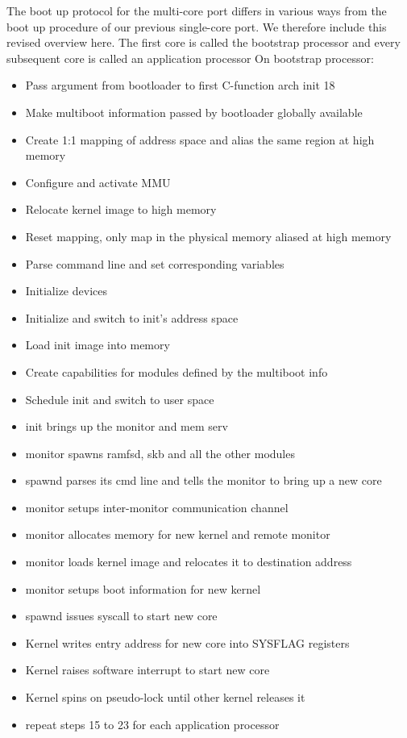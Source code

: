 \documentclass[a4paper,twoside]{report} %
\begin{document}

The boot up protocol for the multi-core port differs in various ways
from the boot up procedure of our previous single-core port. We
therefore include this revised overview here. The first core is called
the bootstrap processor and every subsequent core is called an
application processor On bootstrap processor:

\begin{itemize}
\item Pass argument from bootloader to first C-function arch
  init 18
\item Make multiboot information passed by bootloader globally
  available
\item Create 1:1 mapping of address space and alias the same region at
  high memory
\item Configure and activate MMU
\item Relocate kernel image to high memory
\item Reset mapping, only map in the physical memory aliased at high
  memory
\item Parse command line and set corresponding variables
\item Initialize devices
\item Initialize and switch to init’s address space
\item Load init image into memory
\item Create capabilities for modules defined by the multiboot info
\item Schedule init and switch to user space
\item init brings up the monitor and mem serv
\item monitor spawns ramfsd, skb and all the other modules
\item spawnd parses its cmd line and tells the monitor to bring up a
  new core
\item monitor setups inter-monitor communication channel
\item monitor allocates memory for new kernel and remote monitor
\item monitor loads kernel image and relocates it to destination
  address
\item monitor setups boot information for new kernel
\item spawnd issues syscall to start new core
\item Kernel writes entry address for new core into SYSFLAG registers
\item Kernel raises software interrupt to start new core
\item Kernel spins on pseudo-lock until other kernel releases it
\item repeat steps 15 to 23 for each application processor
\end{itemize}
\end{document}
